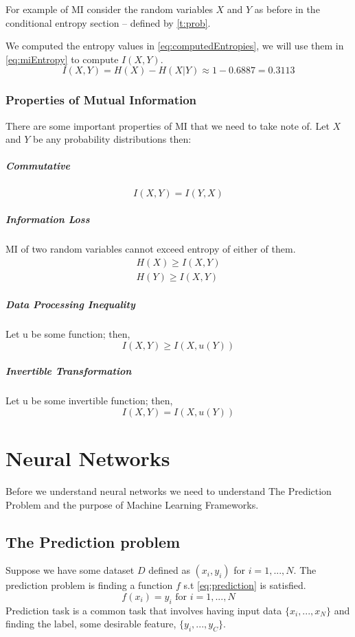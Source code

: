 \documentclass[dissertation.tex]{subfiles}
\begin{document}
For example of MI consider the random variables $X$ and $Y$ as
before in the conditional entropy section -- defined by \autoref{t:prob}. 

We computed the entropy values in \autoref{eq:computedEntropies}, we will use
them in \autoref{eq:miEntropy} to compute $I(X,Y)$.
\begin{equation}
  I(X,Y) = H(X) - H(X|Y) \approx 1 - 0.6887 = 0.3113
\end{equation}

\subsubsection{Properties of Mutual Information} \label{subsubPoMI}
There are some important properties of MI that we need to take note of. Let $X$
and $Y$ be any probability distributions then:

\subparagraph{Commutative} 
\begin{equation}
  I(X,Y) = I(Y, X)
\end{equation}
\subparagraph{Information Loss} MI of two random variables cannot exceed entropy
of either of them.
\begin{align}
  H(X) \geq I(X,Y) \nonumber \\
  H(Y) \geq I(X,Y)
  \label{eq:MIloss}
\end{align}
\subparagraph{Data Processing Inequality} Let u be some function; then,
\begin{equation}
  I(X,Y) \geq I(X, u(Y))
\end{equation}
\subparagraph{Invertible Transformation} Let u be some invertible function;
then,
\begin{equation}
  I(X, Y) = I(X, u(Y))
\end{equation}

\section{Neural Networks}
\label{sec:NN}

Before we understand neural networks we need to understand The Prediction
Problem and the purpose of Machine Learning Frameworks.

\subsection{The Prediction problem} 

Suppose we have some dataset $D$ defined as $(x_i, y_i)$ for $i = 1,...,N$. The
prediction problem is finding a function $f$ s.t \autoref{eq:prediction} is
satisfied.
\begin{equation}
  f(x_i) = y_i \text{ for } i = 1,...,N
  \label{eq:prediction}
\end{equation}
Prediction task is a common task that involves having input data
$\{x_i,...,x_N\}$ and finding the label, some desirable feature,
$\{y_i,...,y_C\}$. 
\end{document}
